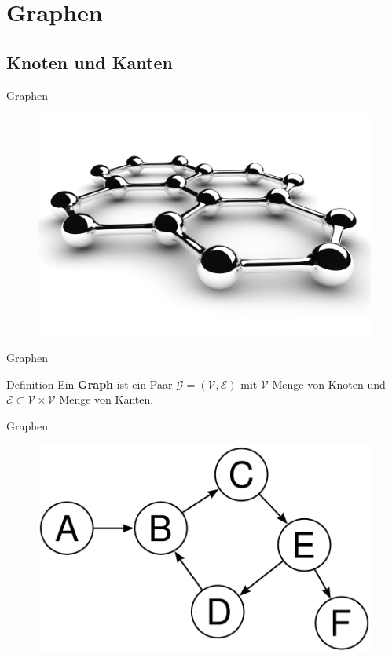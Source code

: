 \documentclass[18pt]{beamer}
\begin{document}
\appendix
\beginbackup

\section{Graphen}

\subsection{Knoten und Kanten}

\begin{frame}{Graphen}
    \begin{figure}
        \includegraphics[scale=2.5]{img/graph.jpg}
    \end{figure}
\end{frame}

\begin{frame}{Graphen}
    \begin{block}{Definition}
        Ein \textbf{Graph} ist ein Paar $\mathcal{G} = (\mathcal{V}, \mathcal{E})$
        mit $\mathcal{V}$ Menge von Knoten
        und $\mathcal{E} \subset \mathcal{V} \times \mathcal{V}$ Menge von Kanten.
    \end{block}

\end{frame}


\begin{frame}{Graphen}
        \begin{figure}
            \includegraphics[scale=.5]{img/graph.png}
        \end{figure}

\end{frame}
\end{document}
